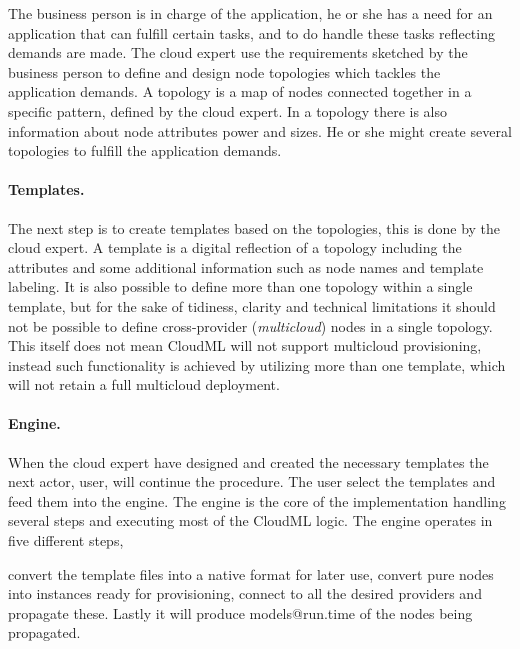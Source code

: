 The business person is in charge of the application, he or she has a need
for an application that can fulfill certain tasks, and to do handle these 
tasks reflecting demands are made.
The cloud expert use the requirements sketched by the business person to 
define and design node topologies which tackles the application demands.
A topology is a map of nodes connected together in a specific pattern, 
defined by the cloud expert.
In a topology there is also information about node attributes 
\eg {} power and  sizes.
He or she might create several topologies to fulfill the application demands.

\paragraph{Templates.}

The next step is to create templates based on the topologies, this is done by
the cloud expert.
A template is a digital reflection of a topology including the attributes and some additional 
information such as node names and template labeling.
It is also possible to define more than one topology within a single template,
but for the sake of tidiness, clarity and technical limitations it 
should not be possible to define cross-provider (\emph{multicloud}) nodes in a single topology.
This itself does not mean CloudML will not support multicloud provisioning,
instead such functionality is achieved by utilizing more than one template,
which will not retain a full multicloud deployment.

\paragraph{Engine.}

When the cloud expert have designed and created the necessary templates the next actor, 
user, will continue the procedure.
The user select the templates and feed them into the engine.
The engine is the core of the implementation handling several steps and executing
most of the CloudML logic.
The engine operates in five different steps, \
\begin{ii}
  \iitem convert the template files into a native format for later use, 
  \iitem convert pure nodes into instances ready for provisioning, 
  \iitem connect to all the desired providers and 
  \iitem propagate these. Lastly it will produce
  \iitem models@run.time of the nodes being propagated.
\end{ii}
